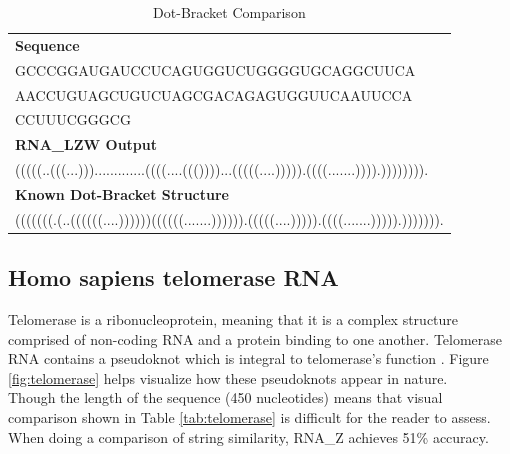 \documentclass[sigconf]{acmart}
\begin{document}
\begin{table}
  \caption{Dot-Bracket Comparison}
  \label{tab:tRNA}
  \begin{tabular}{l}
    \textbf{Sequence}\\
    GCCCGGAUGAUCCUCAGUGGUCUGGGGUGCAGGCUUCA\\
    AACCUGUAGCUGUCUAGCGACAGAGUGGUUCAAUUCCA\\
    CCUUUCGGGCG\\
    \midrule
    \textbf{RNA\_LZW Output}\\
	(((((..(((...))).............((((....((())))...(((((....))))).((((.......)))).)))))))).\\
    \midrule 
    \textbf{Known Dot-Bracket Structure}\\
    (((((((.(..((((((....))))))((((((.......)))))).(((((....))))).((((.......))))).))))))).\\
\end{tabular}
\end{table}


\subsection{Homo sapiens telomerase RNA}

Telomerase is a ribonucleoprotein, meaning that it is a complex structure comprised of non-coding RNA and a protein binding to one another. Telomerase RNA contains a pseudoknot which is integral to telomerase's function \cite{ncbi}.  Figure \ref{fig:telomerase} helps visualize how these pseudoknots appear in nature.\\
Though the length of the sequence (450 nucleotides) means that visual comparison shown in Table \ref{tab:telomerase} is difficult for the reader to assess. When doing a comparison of string similarity, RNA\_Z achieves 51\% accuracy.
\end{document}
